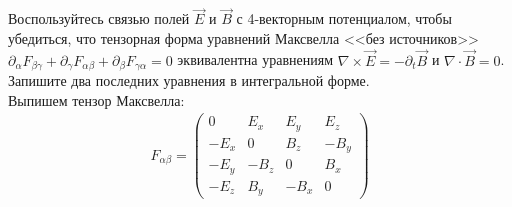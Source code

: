 \documentclass[__main__.tex]{subfiles}
\begin{document}
Воспользуйтесь связью полей $\vec{E}$ и $\vec{B}$ с 4-векторным потенциалом, чтобы убедиться, что тензорная форма уравнений Максвелла <<без источников>> $\partial_{\alpha}F_{\beta\gamma}+\partial_{\gamma}F_{\alpha\beta}+\partial_{\beta}F_{\gamma\alpha}=0$ эквивалентна уравнениям $\nabla\times\vec{E}=-\partial_{t}\vec{B}$ и $\nabla\cdot\vec{B}=0$. Запишите два последних уравнения в интегральной форме.\\ 

Выпишем тензор Максвелла:
\begin{gather*}
F_{\alpha\beta}=
\begin{pmatrix}
	0 & E_x & E_y & E_z\\
	-E_x & 0 & B_z & -B_y\\
	-E_y & -B_z & 0 & B_x\\
	-E_z & B_y & -B_x & 0
\end{pmatrix}
\end{gather*}
\end{document}

